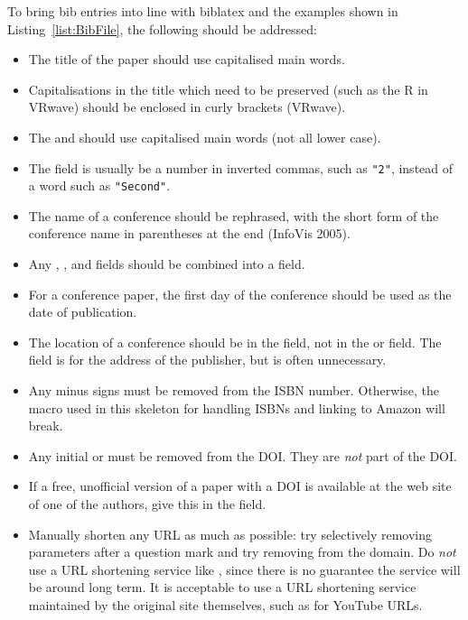 To bring bib entries into line with biblatex and the examples shown in
Listing~\ref{list:BibFile}, the following should be addressed:
\begin{itemize}
\item The title of the paper should use capitalised main words.

\item Capitalisations in the title which need to be preserved (such as
  the R in VRwave) should be enclosed in curly brackets ({VRwave}).

\item The  and  should use
  capitalised main words (not all lower case).

\item The  field is usually be a number in inverted
  commas, such as \verb|"2"|, instead of a word such as
  \verb|"Second"|.

\item The name of a conference should be rephrased, with the short
  form of the conference name in parentheses at the end (InfoVis
  2005).

\item Any , , and 
  fields should be combined into a  field.

\item For a conference paper, the first day of the conference
  should be used as the date of publication.

\item The location of a conference should be in the 
  field, not in the  or  field. The
   field is for the address of the publisher, but is
  often unnecessary.


\item Any minus signs must be removed from the ISBN number.
  Otherwise, the macro used in this skeleton for handling ISBNs and
  linking to Amazon will break.

\item Any initial  or
   must be removed from
  the DOI. They are \emph{not} part of the DOI.

\item If a free, unofficial version of a paper with a DOI is available
  at the web site of one of the authors, give this in the 
  field.

\item Manually shorten any URL as much as possible: try selectively
  removing parameters after a question mark and try removing
   from the domain. Do \emph{not} use a URL shortening
  service like , since there is no guarantee the
  service will be around long term. It is acceptable to use a URL
  shortening service maintained by the original site themselves, such
  as  for YouTube URLs.

\end{itemize}






